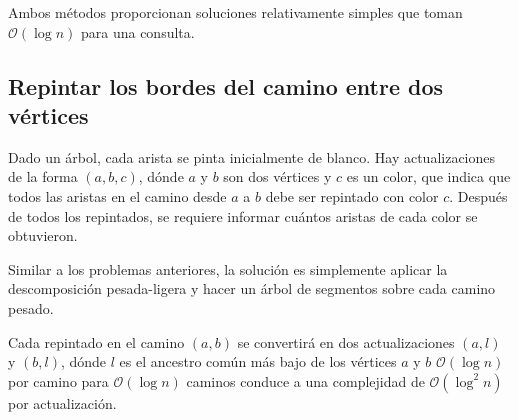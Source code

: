 Ambos métodos proporcionan soluciones relativamente simples que toman $\mathcal{O}(\log n)$ para una consulta.

\subsection{Repintar los bordes del camino entre dos vértices}

Dado un árbol, cada arista se pinta inicialmente de blanco. Hay actualizaciones de la forma $(a,b,c)$, dónde $a$ y $b$ son dos vértices y $c$ es un color, que indica que todos las aristas en el camino desde $a$ a $b$ debe ser repintado con color $c$. Después de todos los repintados, se requiere informar cuántos aristas de cada color se obtuvieron.

Similar a los problemas anteriores, la solución es simplemente aplicar la descomposición pesada-ligera y hacer un árbol de segmentos sobre cada camino pesado.

Cada repintado en el camino $(a,b)$ se convertirá en dos actualizaciones $(a,l)$ y $(b,l)$, dónde $l$ 
es el ancestro común más bajo de los vértices $a$ y $b$ $\mathcal{O}(\log n)$ por camino para 
$\mathcal{O}(\log n)$ caminos conduce a una complejidad de $\mathcal{O}(\log^2 n)$ por actualización.



